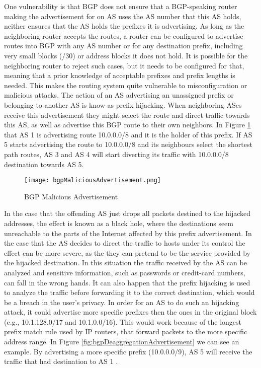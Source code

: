 \documentclass[11pt,a4paper]{scrreprt}
\begin{document}
One vulnerability is that BGP does not ensure that a BGP-speaking router making the advertisement for on AS uses the AS number that this AS holds, neither ensures that the AS holds the prefixes it is advertising. As long as the neighboring router accepts the routes, a router can be configured to advertise routes into BGP with any AS number or for any destination prefix, including very small blocks (/30) or address blocks it does not hold. It is possible for the neighboring router to reject such cases, but it needs to be configured for that, meaning that a prior knowledge of acceptable prefixes and prefix lengths is needed. This makes the routing system quite vulnerable to misconfiguration or malicious attacks. The action of an AS advertising an unassigned prefix or belonging to another AS is know as prefix hijacking. When neighboring ASes receive this advertisement they might select the route and direct traffic towards this AS, as well as advertise this BGP route to their own neighbors. In Figure \ref{fig:bgpMaliciousAdvertisement} that AS 1 is advertising route 10.0.0.0/8 and it is the holder of this prefix. If AS 5 starts advertising the route to 10.0.0.0/8 and its neighbours select the shortest path routes, AS 3 and AS 4 will start diverting its traffic with 10.0.0.0/8 destination towards AS 5.

\begin{figure}[h!]
\centering
\texttt{[image: bgpMaliciousAdvertisement.png]}
\caption{BGP Malicious Advertisement}
\label{fig:bgpMaliciousAdvertisement}
\end{figure}

In the case that the offending AS just drops all packets destined to the hijacked addresses, the effect is known as a black hole, where the destinations seem unreachable to the parts of the Internet affected by this prefix advertisement. In the case that the AS decides to direct the traffic to hosts under its control the effect can be more severe, as the they can pretend to be the service provided by the hijacked destination. In this situation the traffic received by the AS can be analyzed and sensitive information, such as passwords or credit-card numbers, can fall in the wrong hands. It can also happen that the prefix hijacking is used to analyze the traffic before forwarding it to the correct destination, which would be a breach in the user's privacy. In order for an AS to do such an hijacking attack, it could advertise more specific prefixes then the ones in the original block (e.g., 10.1.128.0/17 and 10.1.0.0/16). This would work because of the longest prefix match rule used by IP routers, that forward packets to the more specific address range. In Figure \ref{fig:bgpDeaggregationAdvertisement} we can see an example. By advertising a more specific prefix (10.0.0.0/9), AS 5 will receive the traffic that had destination to AS 1 .
\end{document}

